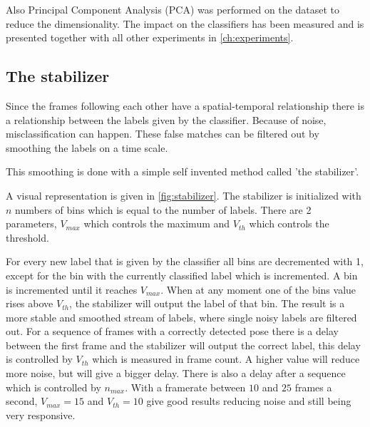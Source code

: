 Also Principal Component Analysis (PCA) was performed on the dataset to reduce the dimensionality. The impact on the classifiers has been measured and is presented together with all other experiments in \autoref{ch:experiments}.

\subsection*{The stabilizer}
Since the frames following each other have a spatial-temporal relationship there is a relationship between the labels given by the classifier. Because of noise, misclassification can happen. These false matches can be filtered out by smoothing the labels on a time scale.

This smoothing is done with a simple self invented method called 'the stabilizer'. 

A visual representation is given in \autoref{fig:stabilizer}. The stabilizer is initialized with $n$ numbers of bins which is equal to the number of labels. There are 2 parameters, $V_{max}$ which controls the maximum and $V_{th}$ which controls the threshold.

For every new label that is given by the classifier all bins are decremented with 1, except for the bin with the currently classified label which is incremented. A bin is incremented until it reaches $V_{max}$. When at any moment one of the bins value rises above $V_{th}$, the stabilizer will output the label of that bin. The result is a more stable and smoothed stream of labels, where single noisy labels are filtered out. For a sequence of frames with a correctly detected pose there is a delay between the first frame and the stabilizer will output the correct label, this delay is controlled by $V_{th}$ which is measured in frame count. A higher value will reduce more noise, but will give a bigger delay. There is also a delay after a sequence which is controlled by $n_{max}$. With a framerate between $10$ and $25$ frames a second, $V_{max} = 15$ and $V_{th} = 10$ give good results reducing noise and still being very responsive. 

